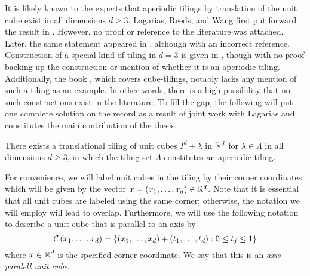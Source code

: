 \documentclass[../thesis.tex]{subfiles}
\begin{document}

It is likely known to the experts that aperiodic tilings by translation of the unit cube exist in all dimensions $d\geq3$. Lagarias, Reeds, and Wang first put forward the result in \cite{lagariasOrthonormalBasesExponentials2000}. However, no proof or reference to the literature was attached. Later, the same statement appeared in \cite{liuUniformityNonUniformGabor2003}, although with an incorrect reference. Construction of a special kind of tiling in $d=3$ is given in \cite{kolountzakisStudyTranslationalTiling2003}, though with no proof backing up the construction or mention of whether it is an aperiodic tiling. Additionally, the book \cite{zongCubeWindowConvex2006}, which covers cube-tilings, notably lacks any mention of such a tiling as an example. In other words, there is a high possibility that no such constructions exist in the literature. To fill the gap, the following will put one complete solution on the record as a result of joint work with Lagarias \cite{haugeAperiodicTilingTranslations2023} and constitutes the main contribution of the thesis. 

\begin{theorem}
    There exists a translational tiling of unit cubes $I^d + \lambda$ in $\mathbb{R}^d$ for $\lambda\in \Lambda$ in all dimensions $d\geq3$, in which the tiling set $\Lambda$ constitutes an aperiodic tiling.
\end{theorem}

For convenience, we will label unit cubes in the tiling by their corner coordinates which will be given by the vector $x = (x_1,\dots,x_d) \in \mathbb{R}^d$. Note that it is essential that all unit cubes are labeled using the same corner; otherwise, the notation we will employ will lead to overlap. Furthermore, we will use the following notation to describe a unit cube that is parallel to an axis by
\begin{equation*}
    \mathcal{C}\left(x_1,\dots,x_d\right) = \left\{(x_1,\dots,x_d) + (t_1,\dots,t_d) : 0 \leq t_j \leq 1\right\}
\end{equation*} 
where $x\in \mathbb{R}^d$ is the specified corner coordinate. We say that this is an \emph{axis-paralell unit cube}. 
\end{document}
